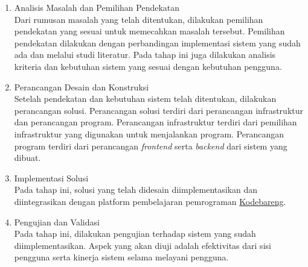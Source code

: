 \begin{enumerate}
    \item Analisis Masalah dan Pemilihan Pendekatan \\
          Dari rumusan masalah yang telah ditentukan, dilakukan pemilihan pendekatan yang sesuai untuk memecahkan masalah tersebut. Pemilihan pendekatan dilakukan dengan perbandingan implementasi sistem yang sudah ada dan melalui studi literatur. Pada tahap ini juga dilakukan analisis kriteria dan kebutuhan sistem yang sesuai dengan kebutuhan pengguna.
    \item Perancangan Desain dan Konstruksi \\
          Setelah pendekatan dan kebutuhan sistem telah ditentukan, dilakukan perancangan solusi. Perancangan solusi terdiri dari perancangan infrastruktur dan perancangan program. Perancangan infrastruktur terdiri dari pemilihan infrastruktur yang digunakan untuk menjalankan program. Perancangan program terdiri dari perancangan \textit{frontend} serta \textit{backend} dari sistem yang dibuat.
    \item Implementasi Solusi \\
          Pada tahap ini, solusi yang telah didesain diimplementasikan dan diintegrasikan dengan platform pembelajaran pemrograman \href{https://kodebareng.id}{Kodebareng}.
    \item Pengujian dan Validasi \\
          Pada tahap ini, dilakukan pengujian terhadap sistem yang sudah diimplementasikan. Aspek yang akan diuji adalah efektivitas dari sisi pengguna serta kinerja sistem selama melayani pengguna.
\end{enumerate}

